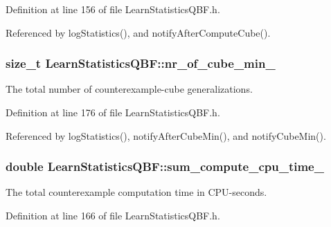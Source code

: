 Definition at line 156 of file Learn\-Statistics\-Q\-B\-F.\-h.



Referenced by log\-Statistics(), and notify\-After\-Compute\-Cube().

\hypertarget{classLearnStatisticsQBF_aff417981063fbdf94164ce7b2d1e71a2}{
\subsubsection[{nr\-\_\-of\-\_\-cube\-\_\-min\-\_\-}]{\setlength{\rightskip}{0pt plus 5cm}size\-\_\-t Learn\-Statistics\-Q\-B\-F\-::nr\-\_\-of\-\_\-cube\-\_\-min\-\_\-\hspace{0.3cm}{\ttfamily [protected]}}}\label{classLearnStatisticsQBF_aff417981063fbdf94164ce7b2d1e71a2}


The total number of counterexample-\/cube generalizations. 



Definition at line 176 of file Learn\-Statistics\-Q\-B\-F.\-h.



Referenced by log\-Statistics(), notify\-After\-Cube\-Min(), and notify\-Cube\-Min().

\hypertarget{classLearnStatisticsQBF_a4caf75f422eed77570e5592ce35c9bd0}{
\subsubsection[{sum\-\_\-compute\-\_\-cpu\-\_\-time\-\_\-}]{\setlength{\rightskip}{0pt plus 5cm}double Learn\-Statistics\-Q\-B\-F\-::sum\-\_\-compute\-\_\-cpu\-\_\-time\-\_\-\hspace{0.3cm}{\ttfamily [protected]}}}\label{classLearnStatisticsQBF_a4caf75f422eed77570e5592ce35c9bd0}


The total counterexample computation time in C\-P\-U-\/seconds. 



Definition at line 166 of file Learn\-Statistics\-Q\-B\-F.\-h.



